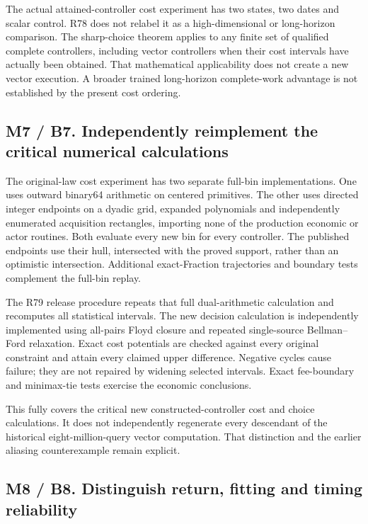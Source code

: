 \documentclass[ecta,nameyear,draft]{econsocart}
\begin{document}
The actual attained-controller cost experiment has two states, two dates
and scalar control. R78 does not relabel it as a high-dimensional or
long-horizon comparison. The sharp-choice theorem applies to any finite
set of qualified complete controllers, including vector controllers when
their cost intervals have actually been obtained. That mathematical
applicability does not create a new vector execution. A broader trained
long-horizon complete-work advantage is not established by the present
cost ordering.

\hypertarget{m7-b7.-independently-reimplement-the-critical-numerical-calculations}{%
\subsection{M7 / B7. Independently reimplement the critical numerical
calculations}\label{m7-b7.-independently-reimplement-the-critical-numerical-calculations}}

The original-law cost experiment has two separate full-bin
implementations. One uses outward binary64 arithmetic on centered
primitives. The other uses directed integer endpoints on a dyadic grid,
expanded polynomials and independently enumerated acquisition
rectangles, importing none of the production economic or actor routines.
Both evaluate every new bin for every controller. The published
endpoints use their hull, intersected with the proved support, rather
than an optimistic intersection. Additional exact-Fraction trajectories
and boundary tests complement the full-bin replay.

The R79 release procedure repeats that full dual-arithmetic calculation
and recomputes all statistical intervals. The new decision calculation
is independently implemented using all-pairs Floyd closure and repeated
single-source Bellman--Ford relaxation. Exact cost potentials are
checked against every original constraint and attain every claimed upper
difference. Negative cycles cause failure; they are not repaired by
widening selected intervals. Exact fee-boundary and minimax-tie tests
exercise the economic conclusions.

This fully covers the critical new constructed-controller cost and
choice calculations. It does not independently regenerate every
descendant of the historical eight-million-query vector computation.
That distinction and the earlier aliasing counterexample remain
explicit.

\hypertarget{m8-b8.-distinguish-return-fitting-and-timing-reliability}{%
\subsection{M8 / B8. Distinguish return, fitting and timing
reliability}\label{m8-b8.-distinguish-return-fitting-and-timing-reliability}}
\end{document}
